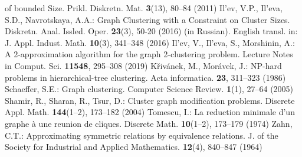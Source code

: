 \documentclass[runningheads]{llncs}
\begin{document}
\begin{thebibliography}{50}
of bounded Size. Prikl. Diskretn. Mat. \textbf{3}(13), 80--84 (2011)
%
 Il'ev, V.P., Il'eva, S.D., Navrotskaya, A.A.: Graph Clustering 
with a Constraint on Cluster Sizes. Diskretn. Anal. Issled. Oper.
\textbf{23}(3), 50-20 (2016) (in Russian).
English transl. in: J. Appl. Indust. Math. \textbf{10}(3), 341--348 (2016)
%
Il'ev, V., Il'eva, S., Morshinin, A.: A 2-approximation
algorithm for the graph 2-clustering problem.
Lecture Notes in Comput. Sci. \textbf{11548}, 295--308 (2019)                  
%
K\v{r}iv\'{a}nek, M., Mor\'{a}vek, J.: NP-hard problems in
hierarchical-tree clustering. Acta informatica.
\textbf{23}, 311--323 (1986)
%
Schaeffer, S.E.: Graph clustering. Computer Science Review. 
\textbf{1}(1), 27--64 (2005)
%
Shamir, R., Sharan, R., Tsur, D.: Cluster graph modification
problems. Discrete Appl. Math. \textbf{144}(1--2), 173--182 (2004)
%
Tomescu, I.: La reduction minimale d'un graphe \`a une reunion de
cliques. Discrete Math. \textbf{10}(1--2), 173--179 (1974)
%
Zahn, C.T.: Approximating symmetric relations by equivalence
relations. J. of the Society for Industrial and Applied
Mathematics. \textbf{12}(4), 840--847 (1964)


\end{thebibliography}
\end{document}
